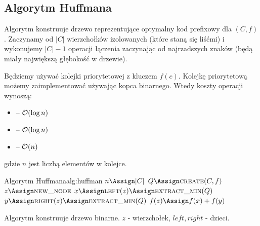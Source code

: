 \subsection{Algorytm Huffmana}

Algorytm konstruuje drzewo reprezentujące optymalny kod prefixowy dla $(C, f)$.
Zaczynamy od $|C|$ wierzchołków izolowanych (które staną się liśćmi) i wykonujemy $|C|-1$ operacji łączenia zaczynając od najrzadszych znaków (będą miały największą głębokość w drzewie).

Będziemy używać kolejki priorytetowej z kluczem $f(c)$. Kolejkę priorytetową możemy zaimplementować używając kopca binarnego. Wtedy koszty operacji wynoszą:
\begin{itemize}[nosep]
	\item {} -- $\mathcal{O}(\log n)$
	\item {} -- $\mathcal{O}(\log n)$
	\item {} -- $\mathcal{O}(n)$
\end{itemize}
gdzie $n$ jest liczbą elementów w kolejce.

\begin{alg}{Algorytm Huffmana}{alg:huffman}
	\State $n \Assign |C|$
	\State $Q \Assign \Call{create}{C, f}$ 
	\State $z \Assign \Call{new\_node}{}$
	\State $x \Assign \Call{left}{z} \Assign \Call{extract\_min}{Q}$
	\State $y \Assign \Call{right}{z} \Assign \Call{extract\_min}{Q}$
	\State $f(z) \Assign f(x) + f(y)$
	\State {}
	\EndFor
	\State \Return {}
	\EndFunction
\end{alg}
Algorytm konstruuje drzewo binarne. $z$ - wierzchołek, $left, right$ - dzieci.

